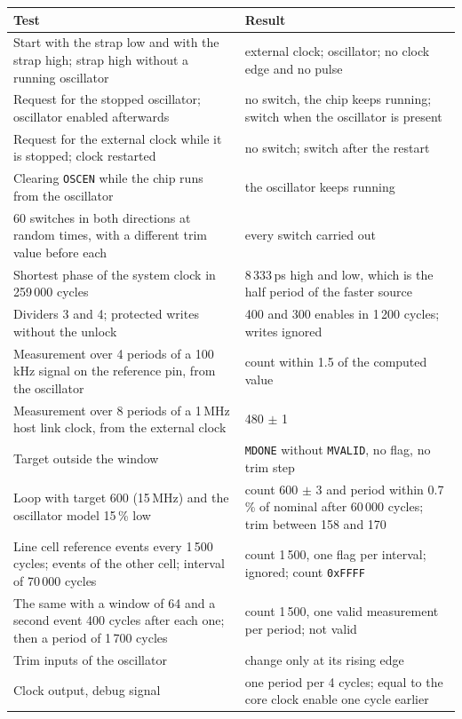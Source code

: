 \documentclass[10pt,a4paper]{article}
\newcommand{\reg}[1]{\texttt{#1}}
\begin{document}
\begin{table}[H]
\centering\small
\begin{tabularx}{\linewidth}{@{}LL@{}}
\toprule
Test & Result \\
\midrule
Start with the strap low and with the strap high; strap high without a running oscillator & external clock; oscillator; no clock edge and no pulse \\
Request for the stopped oscillator; oscillator enabled afterwards & no switch, the chip keeps running; switch when the oscillator is present \\
Request for the external clock while it is stopped; clock restarted & no switch; switch after the restart \\
Clearing \reg{OSCEN} while the chip runs from the oscillator & the oscillator keeps running \\
60 switches in both directions at random times, with a different trim value before each & every switch carried out \\
Shortest phase of the system clock in 259\,000 cycles & 8\,333\,ps high and low, which is the half period of the faster source \\
Dividers 3 and 4; protected writes without the unlock & 400 and 300 enables in 1\,200 cycles; writes ignored \\
Measurement over 4 periods of a 100\,kHz signal on the reference pin, from the oscillator & count within 1.5 of the computed value \\
Measurement over 8 periods of a 1\,MHz host link clock, from the external clock & 480 $\pm$ 1 \\
Target outside the window & \reg{MDONE} without \reg{MVALID}, no flag, no trim step \\
Loop with target 600 (15\,MHz) and the oscillator model 15\,\% low & count 600 $\pm$ 3 and period within 0.7\,\% of nominal after 60\,000 cycles; trim between 158 and 170 \\
Line cell reference events every 1\,500 cycles; events of the other cell; interval of 70\,000 cycles & count 1\,500, one flag per interval; ignored; count \texttt{0xFFFF} \\
The same with a window of 64 and a second event 400 cycles after each one; then a period of 1\,700 cycles & count 1\,500, one valid measurement per period; not valid \\
Trim inputs of the oscillator & change only at its rising edge \\
Clock output, debug signal & one period per 4 cycles; equal to the core clock enable one cycle earlier \\

\end{tabularx}
\end{table}
\end{document}
